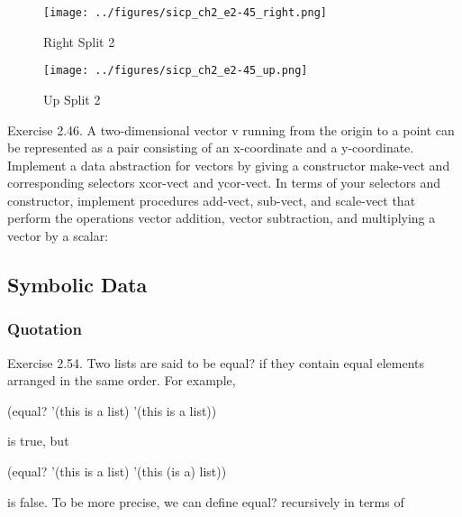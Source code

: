 \begin{figure}[H]
\begin{center}
\texttt{[image: ../figures/sicp\_ch2\_e2-45\_right.png]}
\end{center}
\caption{Right Split 2}
\label{fig:right_split_2}
\end{figure}

\begin{figure}[H]
\begin{center}
\texttt{[image: ../figures/sicp\_ch2\_e2-45\_up.png]}
\end{center}
\caption{Up Split 2}
\label{fig:up_split_2}
\end{figure}

Exercise 2.46.  A two-dimensional vector v running from the origin to a point can be represented as a pair consisting of an x-coordinate and a y-coordinate. Implement a data abstraction for vectors by giving a constructor make-vect and corresponding selectors xcor-vect and ycor-vect. In terms of your selectors and constructor, implement procedures add-vect, sub-vect, and scale-vect that perform the operations vector addition, vector subtraction, and multiplying a vector by a scalar:

        \subsection{Symbolic Data}
            \subsubsection{Quotation}

Exercise 2.54. Two lists are said to be equal? if they contain equal 
elements arranged in the same order. For example,
\newline

(equal? '(this is a list) '(this is a list))
\newline

is true, but
\newline

(equal? '(this is a list) '(this (is a) list))
\newline

is false. To be more precise, we can define equal? recursively in terms of 
\newline

